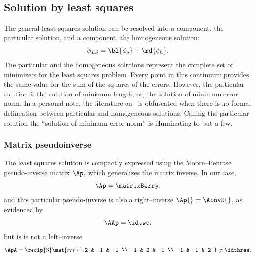 \subsection{Solution by least squares}
The general least squares solution can be resolved into a  component, the particular solution, and a  component, the homogeneous solution: \cite[\S 2.4]{meyer2000matrix}
%
\begin{equation}
	\phi_{LS} = \bl{\phi_{p}} +  \rd{\phi_{h}}. \\
\end{equation}
%
The particular and the homogeneous solutions represent the complete set of minimizers for the least squares problem. Every point in this continuum provides the same value for the sum of the squares of the errors. However, the particular solution is the solution of minimum length, or, the solution of minimum error norm. In a personal note, the literature on \tmls \ is obfuscated when there is no formal delineation between particular and homogeneous solutions. Calling the particular solution the ``solution of minimum error norm'' is illuminating to but a few. 

\subsubsection{Matrix pseudoinverse} 
The least squares solution is compactly expressed using the Moore--Penrose pseudo-inverse matrix $\Ap$, which generalizes the matrix inverse. In our case,
%
\begin{equation}
	\Ap = \matrixBerry.
\end{equation}
%
and this particular pseudo-inverse is also a right--inverse $\Ap{}=\AinvR{}$, as evidenced by
%
\begin{equation}
	\AAp = \idtwo,
\end{equation}
%
but is is not a left--inverse
%
\begin{equation}
	\ApA 
	= \recip{3} \mat{rrr}{
 2 & -1 & -1 \\
 -1 & 2 & -1 \\
 -1 & -1 & 2 }
	\neq \idthree.
\end{equation}
%
